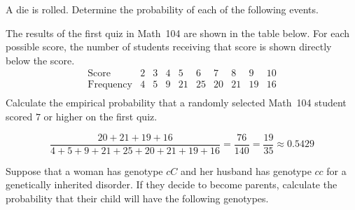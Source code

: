 \documentclass[answers,addpoints,12pt]{exam}
\begin{document}
\begin{questions}

\question[15] A die is rolled. Determine the probability
of each of the following events.

\question[10] The results of the first quiz in Math~104 are
shown in the table below. For each possible score, the number
of students receiving that score is shown directly below
the score.
\[\begin{array}{c|cccccccccc}
\text{Score}&2&3&4&5&6&7&8&9&10\\\hline
\text{Frequency}&4&5&9&21&25&20&21&19&16\\
\end{array}\]
Calculate the empirical probability that a randomly
selected Math~104 student scored $7$ or higher
on the first quiz.
\begin{solution}
\[\frac{20+21+19+16}{4+5+9+21+25+20+21+19+16}
=\frac{76}{140}=\frac{19}{35}\approx 0.5429\]
\end{solution}

\question[10]
Suppose that a woman has genotype $cC$
and her husband has genotype $cc$ for a
genetically inherited disorder.
If they decide to become parents, calculate the
probability that their child will
have the following genotypes.
\end{questions}
\end{document}
